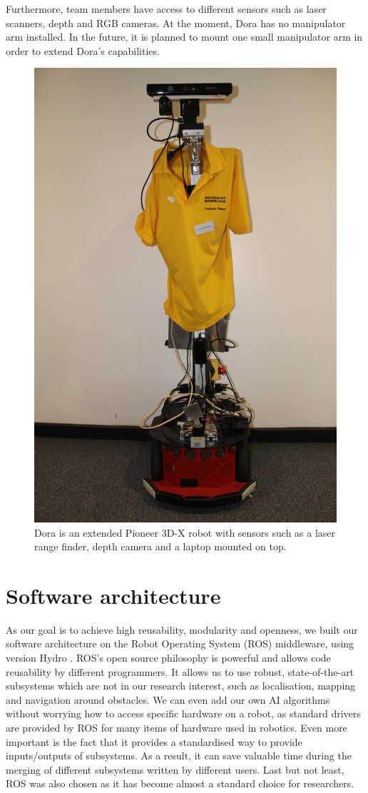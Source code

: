 \documentclass[conference]{IEEEtran}
\begin{document}
Furthermore, team members have access to different sensors such as laser scanners, depth and RGB cameras. At the moment, Dora has no manipulator arm installed. In the future, it is planned to mount one small manipulator arm in order to extend Dora's capabilities.

\begin{figure}[!t]
\centering
\includegraphics[width=2.in]{dora_new.png}
\caption{Dora is an extended Pioneer 3D-X robot with sensors such as a laser range finder, depth camera and a laptop mounted on top.}
\label{fig:dora}
\end{figure}

\section{Software architecture}

As our goal is to achieve high reusability, modularity and openness, we built our software architecture on the Robot Operating System (ROS) middleware, using version Hydro \cite{ros}. ROS's open source philosophy is powerful and allows code reusability by different programmers. It allows us to use robust, state-of-the-art subsystems which are not in our research interest, such as localisation, mapping and navigation around obstacles. We can even add our own AI algorithms without worrying how to access specific hardware on a robot, as standard drivers are provided by ROS for many items of hardware used in robotics. Even more important is the fact that it provides a standardised way to provide inputs/outputs of subsystems. As a result, it can save valuable time during the merging of different subsystems written by different users. Last but not least, ROS was also chosen as it has become almost a standard choice for researchers.
\end{document}
